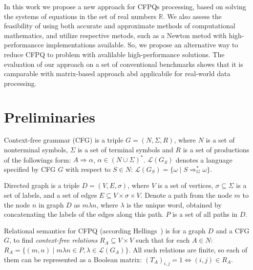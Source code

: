 \documentclass[sigconf]{acmart}
\begin{document}
In this work we propose a new approach for CFPQs processing, based on solving the systems of equations in the set of real numbers $\mathbb{R}$.
We also assess the feasibility of using both accurate and approximate methods of computational mathematics, and utilize respective metods, such as a Newton metod with high-performancce implementations available.
So, we propose an alternative way to reduce CFPQ to problem with avalilable high-performance solutions.
The evaluation of our approach on a set of conventional benchmarks shows that it is camparable with matrix-based approach abd applicabile for real-world data processing.

\section{Preliminaries}

Context-free grammar (CFG) is a triple $G=(N, \Sigma, R)$, where $N$ is a set of nonterminal symbols, $\Sigma$ is a set of terminal symbols and $R$ is a set of productions of the followings form: $A \Rightarrow \alpha$, $\alpha \in (N \cup \Sigma)^*$. 
$\mathcal{L}(G_S)$ denotes a language specified by CFG $G$ with respect to $S \in N$: $\mathcal{L}(G_S) = \{\omega \mid S \Rightarrow_{G}^{*} \omega\}$.

Directed graph is a triple $D = (V,E,\sigma)$, where $V$ is a set of vertices, $\sigma \subseteq \Sigma$ is a set of labels, and a set of edges $E\subseteq V\times \sigma \times V$. 
Denote a path from the node $m$ to the node $n$ in graph $D$ as $m\lambda n$, where
$\lambda$ is the unique word, obtained by concatenating the labels of the edges along this path.
$P$ is a set of all paths in $D$.

Relational semantics for CFPQ (according Hellings~\cite{hellings2014conjunctive}) is for a graph $D$ and a CFG $G$, to find \emph{context-free relations} $R_A \subseteq V \times V$ such that for each $A \in N$: $R_A = \{(m, n) \mid m\lambda n \in P, \lambda \in \mathcal{L}(G_A)\}.$
All such relations are finite, so each of them can be represented as a Boolean matrix: $(T_A)_{i,j} = 1 \iff (i,j) \in R_A$. 

\end{document}
